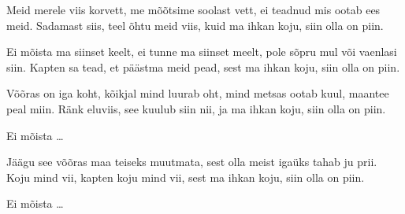 Meid merele viis korvett,
me m\~o\~otsime soolast vett,
ei teadnud mis ootab ees meid.
Sadamast siis, teel \~ohtu meid viis,
kuid ma ihkan koju, siin olla on piin.

Ei m\~oista ma siinset keelt,
ei tunne ma siinset meelt,
pole s\~opru mul v\~oi vaenlasi siin.
Kapten sa tead, et p\"a\"astma meid pead,
sest ma ihkan koju, siin olla on piin.

V\~o\~oras on iga koht,
k\~oikjal mind luurab oht,
mind metsas ootab kuul, maantee peal miin.
R\"ank eluviis, see kuulub siin nii,
ja ma ihkan koju, siin olla on piin.

Ei m\~oista \ldots

J\"a\"agu see v\~o\~oras maa
teiseks muutmata,
sest olla meist iga\"uks tahab ju prii.
Koju mind vii, kapten koju mind vii,
sest ma ihkan koju, siin olla on piin.

Ei m\~oista \ldots